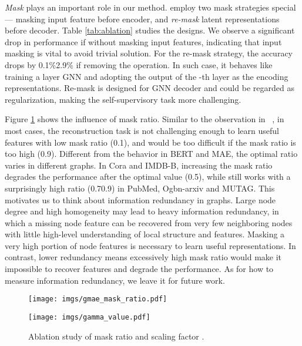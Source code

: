 { \textit{Mask} plays an important role in our method. \model employ two mask strategies special --- masking input feature before encoder, and \textit{re-mask} latent representations before decoder. Table \ref{tab:ablation} studies the designs. We observe a significant drop in performance if without masking input features, indicating that input masking is vital to avoid trivial solution. For the re-mask strategy, the accuracy drops by 0.1\%2.9\% if removing the operation. In such case, it behaves like training a  layer GNN and adopting the output of the -th layer as the encoding representations. Re-mask is designed for GNN decoder and could be regarded as regularization, making the self-supervisory task more challenging.



 Figure \ref{fig:ablation} shows the influence of mask ratio. Similar to the observation in ~\cite{he2021masked}, in most cases, the reconstruction task is not challenging enough to learn useful features with low mask ratio (0.1), and would be too difficult if the mask ratio is too high (0.9). Different from the behavior in BERT and MAE, the optimal ratio varies in different graphs. In Cora and IMDB-B, increasing the mask ratio degrades the performance after the optimal value (0.5), while \model still works with a surprisingly high ratio (0.70.9) in PubMed, Ogbn-arxiv and MUTAG. This motivates us to think about information redundancy in graphs. Large node degree and high homogeneity may lead to heavy information redundancy, in which a missing node feature can be recovered from very few neighboring nodes with little high-level understanding of local structure and features. Masking a very high portion of node features is necessary to learn useful representations. In contrast, lower redundancy means excessively high mask ratio would make it impossible to recover features and degrade the performance. As for how to measure information redundancy, we leave it for future work. 


























\begin{figure}
    \centering
    \begin{minipage}[t]{0.235\textwidth}
        \texttt{[image: imgs/gmae\_mask\_ratio.pdf]}
\end{minipage}
    \begin{minipage}[t]{0.235\textwidth}
        \texttt{[image: imgs/gamma\_value.pdf]}
\end{minipage}
    \caption{Ablation study of mask ratio and scaling factor .}
    \label{fig:ablation}
\end{figure}






}%
